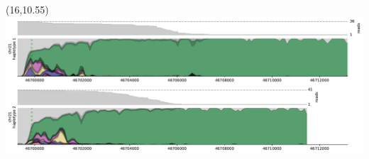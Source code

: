 \documentclass{article}
\begin{document}
\begin{textblock}{1}(16,10.55)  \includegraphics[width=11in]{main-figure-assets/densityplots/chr21-haps.pdf}                    \end{textblock}
\end{document}
